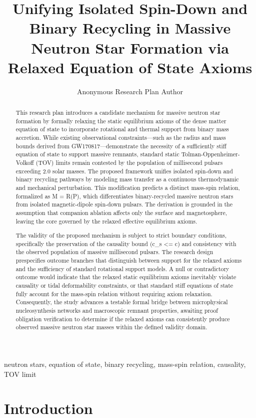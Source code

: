 \documentclass[conference]{IEEEtran}
\begin{document}
\title{Unifying Isolated Spin-Down and Binary Recycling in Massive Neutron Star Formation via Relaxed Equation of State Axioms}\author{Anonymous Research Plan Author}\maketitle

\begin{abstract}
This research plan introduces a candidate mechanism for massive neutron star formation by formally relaxing the static equilibrium axioms of the dense matter equation of state to incorporate rotational and thermal support from binary mass accretion. While existing observational constraints---such as the radius and mass bounds derived from GW170817---demonstrate the necessity of a sufficiently stiff equation of state to support massive remnants, standard static Tolman-Oppenheimer-Volkoff (TOV) limits remain contested by the population of millisecond pulsars exceeding 2.0 solar masses. The proposed framework unifies isolated spin-down and binary recycling pathways by modeling mass transfer as a continuous thermodynamic and mechanical perturbation. This modification predicts a distinct mass-spin relation, formalized as M = R(P), which differentiates binary-recycled massive neutron stars from isolated magnetic-dipole spin-down pulsars. The derivation is grounded in the assumption that companion ablation affects only the surface and magnetosphere, leaving the core governed by the relaxed effective equilibrium axioms.

The validity of the proposed mechanism is subject to strict boundary conditions, specifically the preservation of the causality bound (c\_s <= c) and consistency with the observed population of massive millisecond pulsars. The research design prespecifies outcome branches that distinguish between support for the relaxed axioms and the sufficiency of standard rotational support models. A null or contradictory outcome would indicate that the relaxed static equilibrium axioms inevitably violate causality or tidal deformability constraints, or that standard stiff equations of state fully account for the mass-spin relation without requiring axiom relaxation. Consequently, the study advances a testable formal bridge between microphysical nucleosynthesis networks and macroscopic remnant properties, awaiting proof obligation verification to determine if the relaxed axioms can consistently produce observed massive neutron star masses within the defined validity domain.
\end{abstract}
\begin{IEEEkeywords}
neutron stars, equation of state, binary recycling, mass-spin relation, causality, TOV limit
\end{IEEEkeywords}\section{Introduction}
\end{document}
